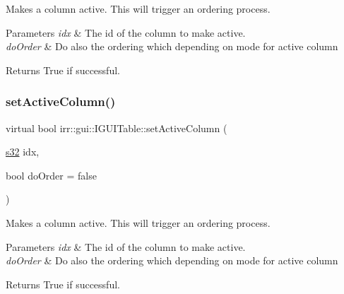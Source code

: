 Makes a column active. This will trigger an ordering process. 


\begin{DoxyParams}{Parameters}
{\em idx} & The id of the column to make active. \\
\hline
{\em do\+Order} & Do also the ordering which depending on mode for active column \\
\hline
\end{DoxyParams}
\begin{DoxyReturn}{Returns}
True if successful. 
\end{DoxyReturn}
\mbox{\label{classirr_1_1gui_1_1IGUITable_ae4882275e6695855c0f3ca55e20f554e}} 
\subsubsection{\texorpdfstring{set\+Active\+Column()}{setActiveColumn()}\hspace{0.1cm}{\footnotesize\ttfamily [2/2]}}
{\footnotesize\ttfamily virtual bool irr\+::gui\+::\+I\+G\+U\+I\+Table\+::set\+Active\+Column (\begin{DoxyParamCaption}\item[{\hyperlink{namespaceirr_ac66849b7a6ed16e30ebede579f9b47c6}{s32}}]{idx,  }\item[{bool}]{do\+Order = {\ttfamily false} }\end{DoxyParamCaption})\hspace{0.3cm}{\ttfamily [pure virtual]}}



Makes a column active. This will trigger an ordering process. 


\begin{DoxyParams}{Parameters}
{\em idx} & The id of the column to make active. \\
\hline
{\em do\+Order} & Do also the ordering which depending on mode for active column \\
\hline
\end{DoxyParams}
\begin{DoxyReturn}{Returns}
True if successful. 
\end{DoxyReturn}
\mbox{\label{classirr_1_1gui_1_1IGUITable_a7d0ce2de316fb7f0e6164e8c196a819e}} 
